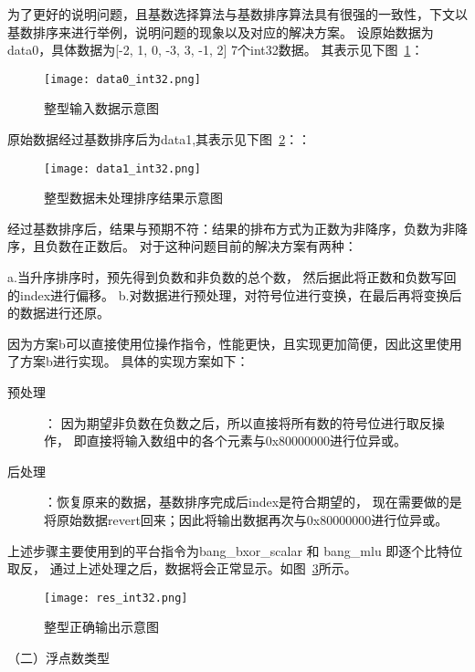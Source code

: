 为了更好的说明问题，且基数选择算法与基数排序算法具有很强的一致性，下文以基数排序来进行举例，说明问题的现象以及对应的解决方案。
设原始数据为data0，具体数据为[-2, 1, 0,  -3, 3, -1, 2]  7个int32数据。
其表示见下图~\ref{fig:data0_int32}：

\begin{figure}[ht]
    \centering
    \texttt{[image: data0\_int32.png]}
    \caption{整型输入数据示意图}
    \label{fig:data0_int32}
\end{figure}


原始数据经过基数排序后为data1,其表示见下图~\ref{fig:data1_int32}：：

\begin{figure}[ht]
    \centering
    \texttt{[image: data1\_int32.png]}
    \caption{整型数据未处理排序结果示意图}
    \label{fig:data1_int32}
\end{figure}


经过基数排序后，结果与预期不符：结果的排布方式为正数为非降序，负数为非降序，且负数在正数后。
对于这种问题目前的解决方案有两种：

a.当升序排序时，预先得到负数和非负数的总个数，
然后据此将正数和负数写回的index进行偏移。
b.对数据进行预处理，对符号位进行变换，在最后再将变换后的数据进行还原。

因为方案b可以直接使用位操作指令，性能更快，且实现更加简便，因此这里使用了方案b进行实现。
具体的实现方案如下：
\begin{description}
\item[预处理]：
因为期望非负数在负数之后，所以直接将所有数的符号位进行取反操作，
即直接将输入数组中的各个元素与0x80000000进行位异或。

\item[后处理]：恢复原来的数据，基数排序完成后index是符合期望的，
现在需要做的是将原始数据revert回来；因此将输出数据再次与0x80000000进行位异或。
\end{description}

上述步骤主要使用到的平台指令为bang\_bxor\_scalar 和 bang\_mlu
即逐个比特位取反， 通过上述处理之后，数据将会正常显示。如图~\ref{fig:res_int32}所示。
\begin{figure}[ht]
    \centering
    \texttt{[image: res\_int32.png]}
    \caption{整型正确输出示意图}
    \label{fig:res_int32}
\end{figure}




（二）浮点数类型

